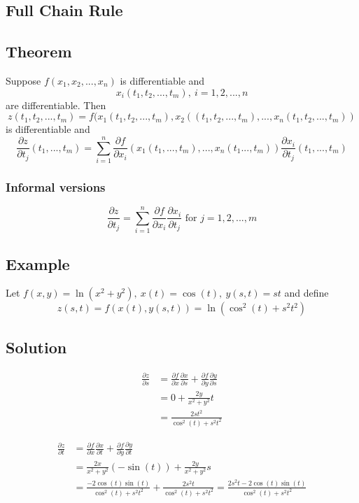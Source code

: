 \documentclass[11pt]{article}
\begin{document}
\subsection{Full Chain Rule}
\subsection{Theorem}
Suppose $f(x_1, x_2, ..., x_n)$ is differentiable and
\[ x_i(t_1, t_2, ..., t_m),\ i = 1, 2, ..., n \]
are differentiable. Then
\[ z(t_1, t_2, ..., t_m) = f(x_1(t_1, t_2, ..., t_m), x_2((t_1, t_2, ..., t_m), ..., x_n(t_1, t_2, ..., t_m)) \]
is differentiable and
\[ \frac{\partial z}{\partial t_j} (t_1, ..., t_m) = \sum_{i=1}^n \frac{\partial f}{\partial x_i}( x_1(t_1, ..., t_m), ..., x_n(t_1 ..., t_m) ) \frac{\partial x_i}{\partial t_j} (t_1, ..., t_m) \]

\subsubsection{Informal versions}
\[ \frac{\partial z}{\partial t_j} = \sum_{i=1}^n \frac{\partial f}{\partial x_i} \frac{\partial x_i}{\partial t_j} \text{ for } j = 1, 2, ..., m  \]

\subsection{Example}
Let $f(x, y) = \ln(x^2 + y^2),\ x(t) = \cos(t),\ y(s, t) = st$ and define
\[ z(s, t) = f(x(t), y(s, t)) = \ln \left( \cos^2(t) + s^2 t^2 \right) \]

\subsection{Solution}
\begin{align*}
\frac{\partial z}{\partial s} &= \frac{\partial f}{\partial x} \frac{\partial x}{\partial s} + \frac{\partial f}{\partial y} \frac{\partial y}{\partial s} \\
&= 0 + \frac{2y}{x^2 + y^2} t \\
&= \frac{2st^2}{\cos^2(t) + s^2t^2}
\end{align*}

\begin{align*}
\frac{\partial z}{\partial t} &= \frac{\partial f}{\partial x} \frac{\partial x}{\partial t} + \frac{\partial f}{\partial y} \frac{\partial y}{\partial t} \\
&= \frac{2x}{x^2 + y^2} (- \sin(t)) + \frac{2y}{x^2 + y^2} s \\
&= \frac{-2\cos(t) \sin(t)}{\cos^2(t) + s^2t^2} + \frac{2s^2t}{\cos^2(t) + s^2t^2} = \frac{2s^2t -2\cos(t) \sin(t)}{\cos^2(t) + s^2t^2}
\end{align*}
\end{document}
